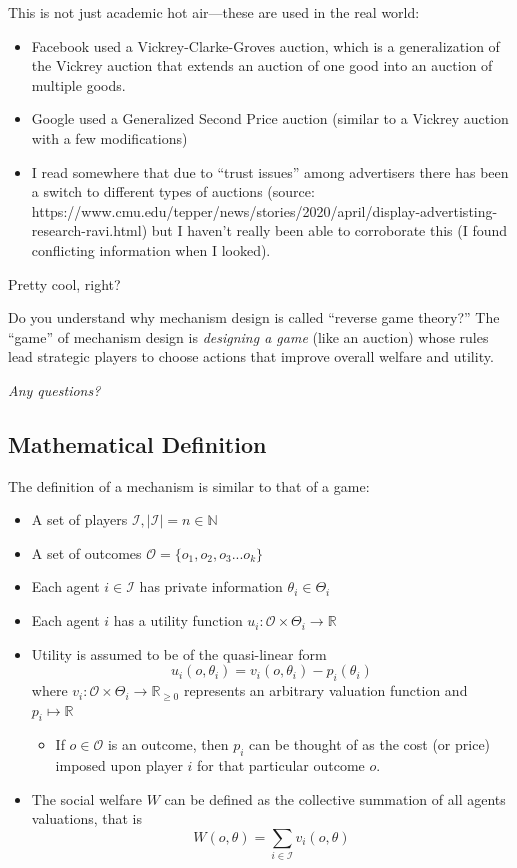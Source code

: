 \documentclass[11pt]{article}
\begin{document}
This is not just academic hot air---these are used in the real world:
\begin{itemize}
    \item Facebook used a Vickrey-Clarke-Groves auction, which is a generalization of the Vickrey auction that extends an auction of one good into an auction of multiple goods.  
    \item Google used a Generalized Second Price auction (similar to a Vickrey auction with a few modifications)
    \item I read somewhere that due to ``trust issues'' among advertisers there has been a switch to different types of auctions (source: https://www.cmu.edu/tepper/news/stories/2020/april/display-advertisting-research-ravi.html) but I haven't really been able to corroborate this (I found conflicting information when I looked).
\end{itemize}

Pretty cool, right? 

Do you understand why mechanism design is called ``reverse game theory?'' The ``game'' of mechanism design is {\it designing a game} (like an auction) whose rules lead strategic players to choose actions that improve overall welfare and utility. 

{\it Any questions?}

\subsection{Mathematical Definition}

The definition of a mechanism is similar to that of a game:

\begin{itemize}
    \item A set of players $\mathcal{I}, |\mathcal{I}| = n \in \mathbb{N}$
    \item A set of outcomes $\mathcal{O} = \{o_1, o_2, o_3...o_k\}$
    \item Each agent $i \in \mathcal{I}$ has private information $\theta_i \in \Theta_i$
    \item Each agent $i$ has a utility function $u_i : \mathcal{O} \times \Theta_i \rightarrow \mathbb{R}$
    \item Utility is assumed to be of the quasi-linear form $$u_i(o, \theta_i) = v_i(o, \theta_i) - p_i(\theta_i)$$ where $v_i : \mathcal{O} \times \Theta_i \rightarrow \mathbb{R}_{\geq 0}$ represents an arbitrary valuation function and $p_i \mapsto \mathbb{R}$ 
    \begin{itemize}
        \item If $o \in \mathcal{O}$ is an outcome, then $p_i$ can be thought of as the cost (or price) imposed upon player $i$ for that particular outcome $o$. 
    \end{itemize}
    \item The social welfare $W$ can be defined as the collective summation of all agents valuations, that is \begin{equation}W(o, \theta) = \sum_{i \in \mathcal{I}} v_i(o, \theta)\end{equation}
\end{itemize}
\end{document}
